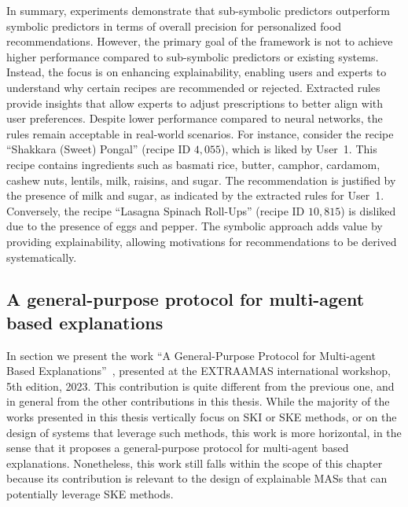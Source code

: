 In summary, experiments demonstrate that sub-symbolic predictors outperform symbolic predictors in terms of overall precision for personalized food recommendations.
%
However, the primary goal of the framework is not to achieve higher performance compared to sub-symbolic predictors or existing systems.
%
Instead, the focus is on enhancing explainability, enabling users and experts to understand why certain recipes are recommended or rejected.
%
Extracted rules provide insights that allow experts to adjust prescriptions to better align with user preferences.
%
Despite lower performance compared to neural networks, the rules remain acceptable in real-world scenarios.
%
For instance, consider the recipe ``Shakkara (Sweet) Pongal'' (recipe ID \(4,055\)), which is liked by User~1.
%
This recipe contains ingredients such as basmati rice, butter, camphor, cardamom, cashew nuts, lentils, milk, raisins, and sugar.
%
The recommendation is justified by the presence of milk and sugar, as indicated by the extracted rules for User~1.
%
Conversely, the recipe ``Lasagna Spinach Roll-Ups'' (recipe ID \(10,815\)) is disliked due to the presence of eggs and pepper.
%
The symbolic approach adds value by providing explainability, allowing motivations for recommendations to be derived systematically.



\subsection{A general-purpose protocol for multi-agent based explanations}\label{subsec:a-general-purpose-protocol-for-multi-agent-based-explanations}
%
In section we present the work ``A General-Purpose Protocol for Multi-agent Based Explanations''~\cite{DBLP:conf/extraamas/CiattoMBAO23}, presented at the \gls{EXTRAAMAS} international workshop, 5th edition, 2023.
%
This contribution is quite different from the previous one, and in general from the other contributions in this thesis.
%
While the majority of the works presented in this thesis vertically focus on \gls{SKI} or \gls{SKE} methods, or on the design of systems that leverage such methods, this work is more horizontal, in the sense that it proposes a general-purpose protocol for multi-agent based explanations.
%
Nonetheless, this work still falls within the scope of this chapter because its contribution is relevant to the design of explainable \glspl{MAS} that can potentially leverage \gls{SKE} methods.


